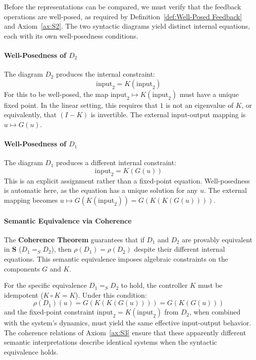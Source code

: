 \documentclass[11pt]{article}
\begin{document}
Before the representations can be compared, we must verify that the feedback operations are well-posed, as required by Definition~\ref{def:Well-Posed Feedback} and Axiom~\ref{ax:S2}. The two syntactic diagrams yield distinct internal equations, each with its own well-posedness conditions.

\paragraph{Well-Posedness of $D_2$}
The diagram $D_2$ produces the internal constraint:
\begin{equation}\label{eq:D2-fixed-point}
    \text{input}_2 = K(\text{input}_2)
\end{equation}
For this to be well-posed, the map $\text{input}_2 \mapsto K(\text{input}_2)$ must have a unique fixed point. In the linear setting, this requires that $1$ is not an eigenvalue of $K$, or equivalently, that $(I - K)$ is invertible. The external input-output mapping is $u \mapsto G(u)$.

\paragraph{Well-Posedness of $D_1$}
The diagram $D_1$ produces a different internal constraint:
\begin{equation}\label{eq:D1-fixed-point}
    \text{input}_2 = K(G(u))
\end{equation}
This is an explicit assignment rather than a fixed-point equation. Well-posedness is automatic here, as the equation has a unique solution for any $u$. The external mapping becomes $u \mapsto G(K(\text{input}_2)) = G(K(K(G(u))))$.

\paragraph{Semantic Equivalence via Coherence}
The \textbf{Coherence Theorem} guarantees that if $D_1$ and $D_2$ are provably equivalent in $\mathbf{S}$ ($D_1 =_S D_2$), then $\rho(D_1) = \rho(D_2)$ despite their different internal equations. This semantic equivalence imposes algebraic constraints on the components $G$ and $K$.

For the specific equivalence $D_1 =_S D_2$ to hold, the controller $K$ must be idempotent ($K \circ K = K$). Under this condition:
\[
\rho(D_1)(u) = G(K(K(G(u)))) = G(K(G(u)))
\]
and the fixed-point constraint $\text{input}_2 = K(\text{input}_2)$ from $D_2$, when combined with the system's dynamics, must yield the same effective input-output behavior. The coherence relations of Axiom~\ref{ax:S3} ensure that these apparently different semantic interpretations describe identical systems when the syntactic equivalence holds.
\end{document}
